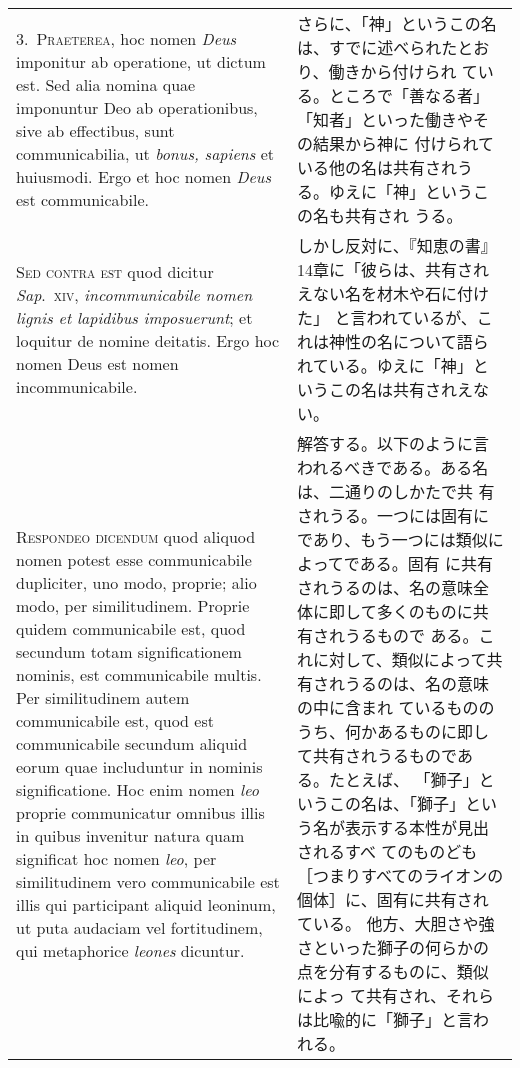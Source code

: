 \documentclass[10pt]{jsarticle} %
\begin{document}
\begin{longtable}{p{21em}p{21em}}
\\

3.~{\scshape Praeterea}, hoc nomen {\itshape Deus} imponitur ab
operatione, ut dictum est. Sed alia nomina quae imponuntur Deo ab
operationibus, sive ab effectibus, sunt communicabilia, ut {\itshape bonus,
sapiens} et huiusmodi. Ergo et hoc nomen {\itshape Deus} est communicabile.

&

さらに、「神」というこの名は、すでに述べられたとおり、働きから付けられ
ている。ところで「善なる者」「知者」といった働きやその結果から神に
付けられている他の名は共有されうる。ゆえに「神」というこの名も共有され
うる。

\\


{\scshape Sed contra est} quod dicitur {\itshape Sap}.~{\scshape xiv},
{\itshape incommunicabile nomen lignis et lapidibus imposuerunt}; et
loquitur de nomine deitatis. Ergo hoc nomen Deus est nomen
incommunicabile.


&

しかし反対に、『知恵の書』14章に「彼らは、共有されえない名を材木や石に付けた」
と言われているが、これは神性の名について語られている。ゆえに「神」と
いうこの名は共有されえない。

\\


{\scshape Respondeo dicendum} quod aliquod nomen potest esse
communicabile dupliciter, uno modo, proprie; alio modo, per
similitudinem. Proprie quidem communicabile est, quod secundum totam
significationem nominis, est communicabile multis. Per similitudinem
autem communicabile est, quod est communicabile secundum aliquid eorum
quae includuntur in nominis significatione. Hoc enim nomen {\itshape
leo} proprie communicatur omnibus illis in quibus invenitur natura quam
significat hoc nomen {\itshape leo}, per similitudinem vero
communicabile est illis qui participant aliquid leoninum, ut puta
audaciam vel fortitudinem, qui metaphorice {\itshape leones} dicuntur.

&

解答する。以下のように言われるべきである。ある名は、二通りのしかたで共
有されうる。一つには固有にであり、もう一つには類似によってである。固有
に共有されうるのは、名の意味全体に即して多くのものに共有されうるもので
ある。これに対して、類似によって共有されうるのは、名の意味の中に含まれ
ているもののうち、何かあるものに即して共有されうるものである。たとえば、
「獅子」というこの名は、「獅子」という名が表示する本性が見出されるすべ
てのものども［つまりすべてのライオンの個体］に、固有に共有されている。
他方、大胆さや強さといった獅子の何らかの点を分有するものに、類似によっ
て共有され、それらは比喩的に「獅子」と言われる。


\end{longtable}
\end{document}
